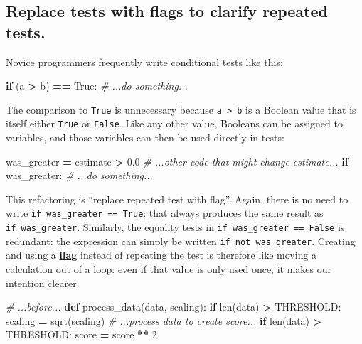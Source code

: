 \documentclass[
]{krantz}
\makeatletter
\newenvironment{Shaded}{\begin{snugshade}}{\end{snugshade}}
\newcommand{\BuiltInTok}[1]{#1}
\newcommand{\CommentTok}[1]{\textcolor[rgb]{0.56,0.35,0.01}{\textit{#1}}}
\newcommand{\ControlFlowTok}[1]{\textcolor[rgb]{0.13,0.29,0.53}{\textbf{#1}}}
\newcommand{\DecValTok}[1]{\textcolor[rgb]{0.00,0.00,0.81}{#1}}
\newcommand{\FloatTok}[1]{\textcolor[rgb]{0.00,0.00,0.81}{#1}}
\newcommand{\KeywordTok}[1]{\textcolor[rgb]{0.13,0.29,0.53}{\textbf{#1}}}
\newcommand{\NormalTok}[1]{#1}
\newcommand{\OperatorTok}[1]{\textcolor[rgb]{0.81,0.36,0.00}{\textbf{#1}}}
\newcommand{\VariableTok}[1]{\textcolor[rgb]{0.00,0.00,0.00}{#1}}
\newenvironment{kframe}{%
\medskip{}
\setlength{\fboxsep}{.8em}
 \def\at@end@of@kframe{}%
 \ifinner\ifhmode%
  \def\at@end@of@kframe{\end{minipage}}%
  \begin{minipage}{\columnwidth}%
 \fi\fi%
 \def\FrameCommand##1{\hskip\@totalleftmargin \hskip-\fboxsep
 \colorbox{shadecolor}{##1}\hskip-\fboxsep
     \hskip-\linewidth \hskip-\@totalleftmargin \hskip\columnwidth}%
 \MakeFramed {\advance\hsize-\width
   \@totalleftmargin\z@ \linewidth\hsize
   \@setminipage}}%
 {\par\unskip\endMakeFramed%
 \at@end@of@kframe}
\renewenvironment{Shaded}{\begin{kframe}}{\end{kframe}}
\newcommand{\gref}[2]{\hyperlink{#2}{\textbf{#1}}}
\makeatother
\begin{document}
\hypertarget{replace-tests-with-flags-to-clarify-repeated-tests.}{%
\subsection{Replace tests with flags to clarify repeated tests.}\label{replace-tests-with-flags-to-clarify-repeated-tests.}}

Novice programmers frequently write conditional tests like this:

\begin{Shaded}
\begin{Highlighting}[]
\ControlFlowTok{if}\NormalTok{ (a }\OperatorTok{\textgreater{}}\NormalTok{ b) }\OperatorTok{==} \VariableTok{True}\NormalTok{:}
    \CommentTok{\# ...do something...}
\end{Highlighting}
\end{Shaded}

The comparison to \texttt{True} is unnecessary because \texttt{a\ \textgreater{}\ b} is a Boolean value
that is itself either \texttt{True} or \texttt{False}.
Like any other value,
Booleans can be assigned to variables,
and those variables can then be used directly in tests:

\begin{Shaded}
\begin{Highlighting}[]
\NormalTok{was\_greater }\OperatorTok{=}\NormalTok{ estimate }\OperatorTok{\textgreater{}} \FloatTok{0.0}
\CommentTok{\# ...other code that might change estimate...}
\ControlFlowTok{if}\NormalTok{ was\_greater:}
    \CommentTok{\# ...do something...}
\end{Highlighting}
\end{Shaded}

This refactoring is ``replace repeated test with flag''.
Again,
there is no need to write \texttt{if\ was\_greater\ ==\ True}:
that always produces the same result as \texttt{if\ was\_greater}.
Similarly,
the equality tests in \texttt{if\ was\_greater\ ==\ False} is redundant:
the expression can simply be written \texttt{if\ not\ was\_greater}.
Creating and using a \gref{flag}{flag\_variable} instead of repeating the test
is therefore like moving a calculation out of a loop:
even if that value is only used once,
it makes our intention clearer.

\begin{Shaded}
\begin{Highlighting}[]
\CommentTok{\# ...before...}
\KeywordTok{def}\NormalTok{ process\_data(data, scaling):}
    \ControlFlowTok{if} \BuiltInTok{len}\NormalTok{(data) }\OperatorTok{\textgreater{}}\NormalTok{ THRESHOLD:}
\NormalTok{        scaling }\OperatorTok{=}\NormalTok{ sqrt(scaling)}
    \CommentTok{\# ...process data to create score...}
    \ControlFlowTok{if} \BuiltInTok{len}\NormalTok{(data) }\OperatorTok{\textgreater{}}\NormalTok{ THRESHOLD:}
\NormalTok{        score }\OperatorTok{=}\NormalTok{ score }\OperatorTok{**} \DecValTok{2}
\end{Highlighting}
\end{Shaded}
\end{document}
